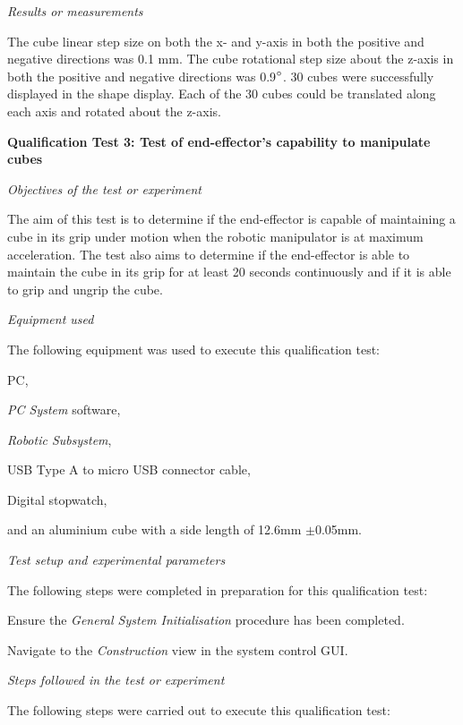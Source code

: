 \textit{Results or measurements}

The cube linear step size on both the x- and y-axis in both the positive and negative directions was 0.1 mm. The cube rotational step size about the z-axis in both the positive and negative directions was 0.9$^{\circ}$. 30 cubes were successfully displayed in the shape display. Each of the 30 cubes could be translated along each axis and rotated about the z-axis.

\textbf{Qualification Test 3: Test of end-effector's capability to manipulate cubes}

\textit{Objectives of the test or experiment}

The aim of this test is to determine if the end-effector is capable of maintaining a cube in its grip under motion when the robotic manipulator is at maximum acceleration. The test also aims to determine if the end-effector is able to maintain the cube in its grip for at least 20 seconds continuously and if it is able to grip and ungrip the cube.

\textit{Equipment used}

The following equipment was used to execute this qualification test:

\begin{compactitem}
	\item PC,
	\item \textit{PC System} software,
	\item \textit{Robotic Subsystem},
	\item USB Type A to micro USB connector cable,
	\item Digital stopwatch,
	\item and an aluminium cube with a side length of 12.6mm $\pm$0.05mm.
\end{compactitem}

\textit{Test setup and experimental parameters} 

The following steps were completed in preparation for this qualification test:

\begin{compactenum}
	\item Ensure the \textit{General System Initialisation} procedure has been completed.
	\item Navigate to the \textit{Construction} view in the system control GUI.
\end{compactenum}

\textit{Steps followed in the test or experiment}

The following steps were carried out to execute this qualification test:

